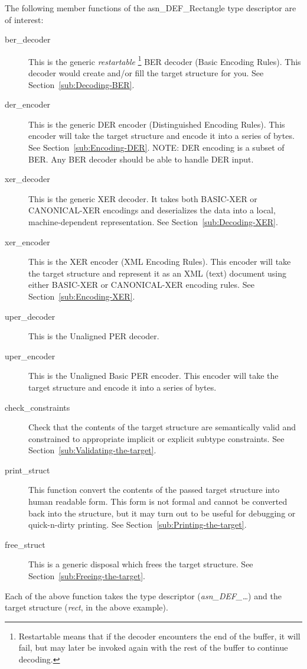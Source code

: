 \documentclass[english,oneside,12pt]{book}
\begin{document}
The following member functions of the asn\_DEF\_Rectangle type descriptor
are of interest:
\begin{description}
\item [{ber\_decoder}] This is the generic \emph{restartable}%
\footnote{Restartable means that if the decoder encounters the end of the buffer,
it will fail, but may later be invoked again with the rest of the
buffer to continue decoding.%
} BER decoder (Basic Encoding Rules). This decoder would create and/or
fill the target structure for you. See Section~\ref{sub:Decoding-BER}.
\item [{der\_encoder}] This is the generic DER encoder (Distinguished Encoding
Rules). This encoder will take the target structure and encode it
into a series of bytes. See Section~\ref{sub:Encoding-DER}. NOTE:
DER encoding is a subset of BER. Any BER decoder should be able to
handle DER input.
\item [{xer\_decoder}] This is the generic XER decoder. It takes both BASIC-XER
or CANONICAL-XER encodings and deserializes the data into a local,
machine-dependent representation. See Section~\ref{sub:Decoding-XER}.
\item [{xer\_encoder}] This is the XER encoder (XML Encoding Rules). This
encoder will take the target structure and represent it as an XML
(text) document using either BASIC-XER or CANONICAL-XER encoding rules.
See Section~\ref{sub:Encoding-XER}.
\item [{uper\_decoder}] This is the Unaligned PER decoder.
\item [{uper\_encoder}] This is the Unaligned Basic PER encoder. This encoder
will take the target structure and encode it into a series of bytes.
\item [{check\_constraints}] Check that the contents of the target structure
are semantically valid and constrained to appropriate implicit or
explicit subtype constraints. See Section~\ref{sub:Validating-the-target}.
\item [{print\_struct}] This function convert the contents of the passed
target structure into human readable form. This form is not formal
and cannot be converted back into the structure, but it may turn out
to be useful for debugging or quick-n-dirty printing. See Section~\ref{sub:Printing-the-target}.
\item [{free\_struct}] This is a generic disposal which frees the target
structure. See Section~\ref{sub:Freeing-the-target}.
\end{description}
Each of the above function takes the type descriptor (\emph{asn\_DEF\_\ldots{}})
and the target structure (\emph{rect}, in the above example).
\end{document}
